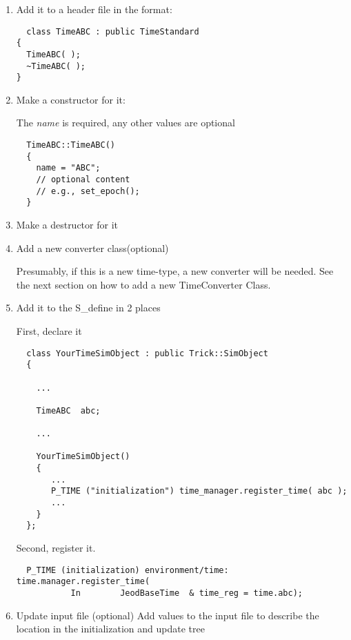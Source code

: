\begin{enumerate}


\item{Add it to a header file in the format:}

\begin{verbatim}
  class TimeABC : public TimeStandard 
{
  TimeABC( );
  ~TimeABC( );
}
\end{verbatim}


\item{Make a constructor for it:}

The \textit{name} is required, any other values are optional

\begin{verbatim}
  TimeABC::TimeABC()
  {
    name = "ABC";
    // optional content
    // e.g., set_epoch();
  }
\end{verbatim}

\item{Make a destructor for it}
\item{Add a new converter class(optional)} 

Presumably, if this is a new time-type, a new converter will be needed. 
See the next section on how to add a new TimeConverter Class.

\item{Add it to the S\_define in 2 places}

First, declare it
\begin{verbatim}
  class YourTimeSimObject : public Trick::SimObject
  {
    
    ...

    TimeABC  abc;
    
    ...

    YourTimeSimObject()
    {
       ...
       P_TIME ("initialization") time_manager.register_time( abc );
       ...
    }
  };
\end{verbatim}

Second, register it.

\begin{verbatim}
  P_TIME (initialization) environment/time:     time.manager.register_time( 
           In        JeodBaseTime  & time_reg = time.abc);
\end{verbatim}

\item{Update input file (optional)}
Add values to the input file to describe the location in the
initialization and update tree

\end{enumerate}




